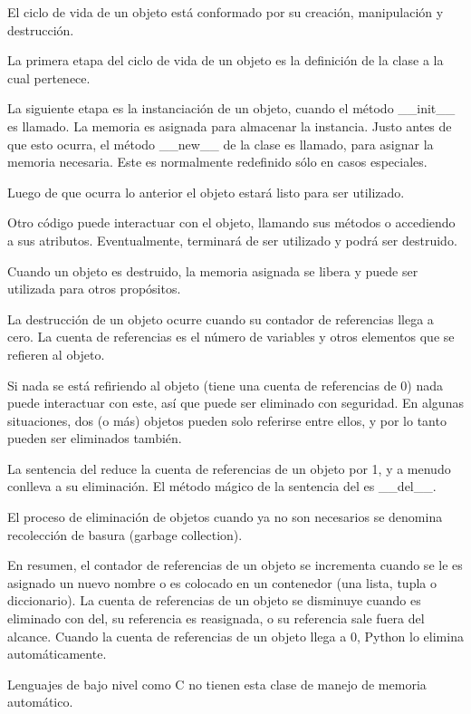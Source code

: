 \documentclass{report}
\begin{document}
{El ciclo de vida de un objeto está conformado por su creación, manipulación y destrucción.

La primera etapa del ciclo de vida de un objeto es la definición de la clase a la cual pertenece.

La siguiente etapa es la instanciación de un objeto, cuando el método \_\_init\_\_ es llamado. La memoria es asignada para almacenar la instancia. Justo antes de que esto ocurra, el método \_\_new\_\_ de la clase es llamado, para asignar la memoria necesaria. Este es normalmente redefinido sólo en casos especiales.

Luego de que ocurra lo anterior el objeto estará listo para ser utilizado.

Otro código puede interactuar con el objeto, llamando sus métodos o accediendo a sus atributos. Eventualmente, terminará de ser utilizado y podrá ser destruido.

Cuando un objeto es destruido, la memoria asignada se libera y puede ser utilizada para otros propósitos.

La destrucción de un objeto ocurre cuando su contador de referencias llega a cero. La cuenta de referencias es el número de variables y otros elementos que se refieren al objeto.

Si nada se está refiriendo al objeto (tiene una cuenta de referencias de 0) nada puede interactuar con este, así que puede ser eliminado con seguridad.
En algunas situaciones, dos (o más) objetos pueden solo referirse entre ellos, y por lo tanto pueden ser eliminados también.

La sentencia del reduce la cuenta de referencias de un objeto por 1, y a menudo conlleva a su eliminación. El método mágico de la sentencia del es \_\_del\_\_.

El proceso de eliminación de objetos cuando ya no son necesarios se denomina recolección de basura (garbage collection).

En resumen, el contador de referencias de un objeto se incrementa cuando se le es asignado un nuevo nombre o es colocado en un contenedor (una lista, tupla o diccionario). La cuenta de referencias de un objeto se disminuye cuando es eliminado con del, su referencia es reasignada, o su referencia sale fuera del alcance. Cuando la cuenta de referencias de un objeto llega a 0, Python lo elimina automáticamente.


Lenguajes de bajo nivel como C no tienen esta clase de manejo de memoria automático.

}
\end{document}
